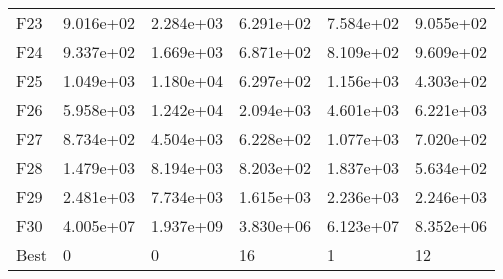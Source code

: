 \begin{tabular}{llllll}
F23  &  9.016e+02 &  2.284e+03 &  6.291e+02 &  7.584e+02 &  9.055e+02 \\
F24  &  9.337e+02 &  1.669e+03 &  6.871e+02 &  8.109e+02 &  9.609e+02 \\
F25  &  1.049e+03 &  1.180e+04 &  6.297e+02 &  1.156e+03 &  4.303e+02 \\
F26  &  5.958e+03 &  1.242e+04 &  2.094e+03 &  4.601e+03 &  6.221e+03 \\
F27  &  8.734e+02 &  4.504e+03 &  6.228e+02 &  1.077e+03 &  7.020e+02 \\
F28  &  1.479e+03 &  8.194e+03 &  8.203e+02 &  1.837e+03 &  5.634e+02 \\
F29  &  2.481e+03 &  7.734e+03 &  1.615e+03 &  2.236e+03 &  2.246e+03 \\
F30  &  4.005e+07 &  1.937e+09 &  3.830e+06 &  6.123e+07 &  8.352e+06 \\
Best &          0 &          0 &         16 &          1 &         12 \\
\bottomrule
\end{tabular}
